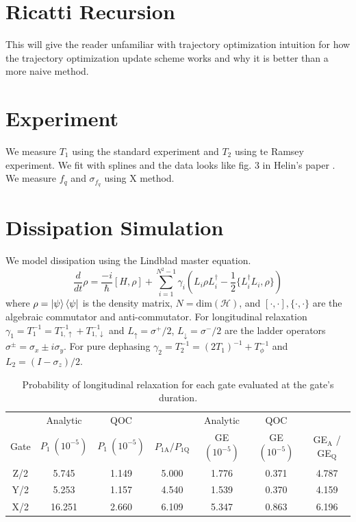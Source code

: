 \documentclass[
  amsfonts,
  amsmath,
  tbtags,
  amssymb,
  aps,
  nobibnotes,
  twocolumn,
  superscriptaddress,
]{revtex4-2}
\begin{document}
\appendix
\section{Ricatti Recursion}
This will give the reader unfamiliar with trajectory
optimization intuition for how the trajectory optimization
update scheme works and why it is better than
a more naive method.


\section{Experiment}
We measure $T_{1}$ using the standard experiment
and $T_{2}$ using te Ramsey experiment. We fit with splines
and the data looks like fig. 3 in Helin's paper \cite{zhang2020universal}.
We measure $f_{q}$ and $\sigma_{f_{q}}$ using X method.


\section{Dissipation Simulation}
We model dissipation using the Lindblad master
equation. 
\begin{equation}
  \frac{d}{dt} \rho = \frac{-i}{\hbar} [H, \rho] + \sum_{i = 1}^{N^{2} - 1} \gamma_{i} (L_{i} \rho L_{i}^{\dagger} - \frac{1}{2} \{L_{i}^{\dagger} L_{i}, \rho\})
\end{equation}
where $\rho = \ket{\psi}\bra{\psi}$ is the density matrix, $N = \textrm{dim}(\mathcal{H})$,
and $[\cdot, \cdot], \{\cdot, \cdot \}$ are the algebraic commutator and anti-commutator.
For longitudinal relaxation $\gamma_{1} = T_{1}^{-1} = T_{1, \uparrow}^{-1} + T_{1, \downarrow}^{-1}$
and $L_{\uparrow} = \sigma^{+}/2$,
$L_{\downarrow} = \sigma^{-}/2$
are the ladder operators $\sigma^{\pm} = \sigma_{x} \pm i \sigma_{y}$. For pure dephasing
$\gamma_{2} = T_{2}^{-1} = (2 T_{1})^{-1} + T_{\phi}^{-1}$ and
$L_{2} = (I - \sigma_{z})/2$.

\begin{table}[ht]
  \begin{tabular}{c | c | c | c | c | c | c}
         & Analytic & QOC & & Analytic & QOC & \\
    Gate & $P_{1}\ (10^{-5})$ & $P_{1}\ (10^{-5})$ & $P_{1\textrm{A}} / P_{1\textrm{Q}}$
    & GE $(10^{-5})$ & GE $(10^{-5})$ & GE$_{\textrm{A}}$ / GE$_{\textrm{Q}}$\\
    \hline
    Z/2 & 5.745  & 1.149 & 5.000 & 1.776 & 0.371 & 4.787\\
    Y/2 & 5.253  & 1.157 & 4.540 & 1.539 & 0.370 & 4.159\\
    X/2 & 16.251 & 2.660 & 6.109 & 5.347 & 0.863 & 6.196\\
  \end{tabular}
  \caption{Probability of longitudinal relaxation for each gate
    evaluated at the gate's duration.}
\end{table}
\end{document}
